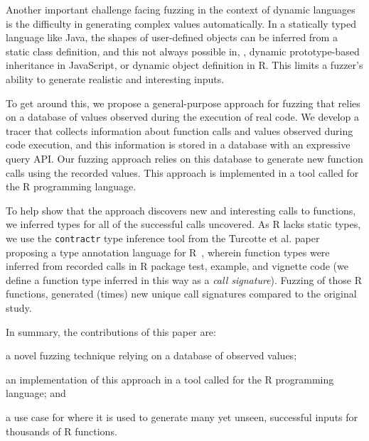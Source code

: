 \documentclass[sigplan,anonymous,review]{acmart}
\begin{document}
Another important challenge facing fuzzing in the context of dynamic languages is the difficulty in generating complex values automatically.
In a statically typed language like Java, the shapes of user-defined objects can be inferred from a static class definition, and this not always possible in, \Eg, dynamic prototype-based inheritance in JavaScript, or dynamic object definition in R.
This limits a fuzzer's ability to generate realistic and interesting inputs.

To get around this, we propose a general-purpose approach for fuzzing that relies on a database of values observed during the execution of real code.
We develop a tracer that collects information about function calls and values observed during code execution, and this information is stored in a database with an expressive query API.
Our fuzzing approach relies on this database to generate new function calls using the recorded values.
This approach is implemented in a tool called \tool for the R programming language.

To help show that the approach discovers new and interesting calls to functions, we inferred types for all of the successful calls \tool uncovered.
As R lacks static types, we use the {\tt contractr} type inference tool from the Turcotte et al. paper proposing a type annotation language for R~\cite{turcotte2020designing}, wherein function types were inferred from recorded calls in R package test, example, and vignette code (we define a function type inferred in this way as a \textit{call signature}).
Fuzzing \UFNumFunctions of those R functions, \tool generated \UFSignatrSignaturesRnd (\UFSignatrBaselineSignaturesRatio times) new unique call signatures compared to the original study.



In summary, the contributions of this paper are:
%
\begin{inparaenum}[(1)]
    \item a novel fuzzing technique relying on a database of observed values;
    \item an implementation of this approach in a tool called \tool for the R programming language; and
    \item a use case for \tool where it is used to generate many yet unseen, successful inputs for thousands of R functions.
\end{inparaenum} 
\end{document}
